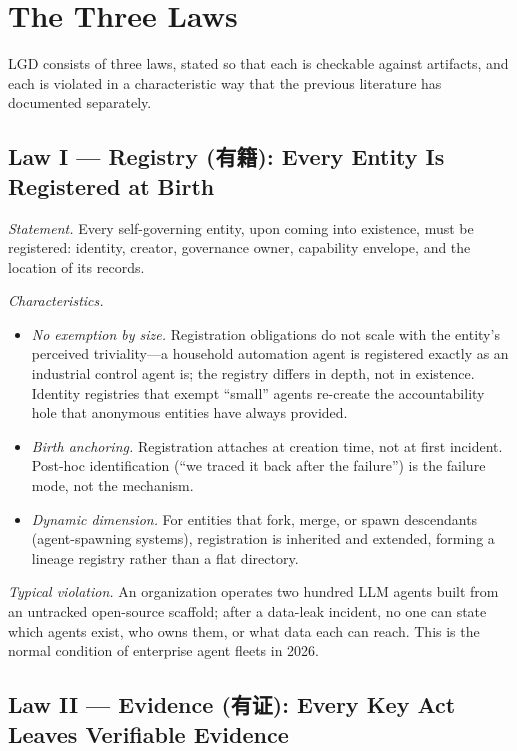 \documentclass[12pt]{article}
\begin{document}
\section{The Three Laws}\label{sec:threelaws}

LGD consists of three laws, stated so that each is checkable against artifacts, and each is violated in a characteristic way that the previous literature has documented separately.

\subsection{Law I --- Registry (有籍): Every Entity Is Registered at Birth}

\emph{Statement.} Every self-governing entity, upon coming into existence, must be registered: identity, creator, governance owner, capability envelope, and the location of its records.

\emph{Characteristics.}
\begin{itemize}[itemsep=1pt]
  \item \emph{No exemption by size.} Registration obligations do not scale with the entity's perceived triviality---a household automation agent is registered exactly as an industrial control agent is; the registry differs in depth, not in existence. Identity registries that exempt ``small'' agents re-create the accountability hole that anonymous entities have always provided.
  \item \emph{Birth anchoring.} Registration attaches at creation time, not at first incident. Post-hoc identification (``we traced it back after the failure'') is the failure mode, not the mechanism.
  \item \emph{Dynamic dimension.} For entities that fork, merge, or spawn descendants (agent-spawning systems), registration is inherited and extended, forming a lineage registry rather than a flat directory.
\end{itemize}

\emph{Typical violation.} An organization operates two hundred LLM agents built from an untracked open-source scaffold; after a data-leak incident, no one can state which agents exist, who owns them, or what data each can reach. This is the normal condition of enterprise agent fleets in 2026.

\subsection{Law II --- Evidence (有证): Every Key Act Leaves Verifiable Evidence}
\end{document}
